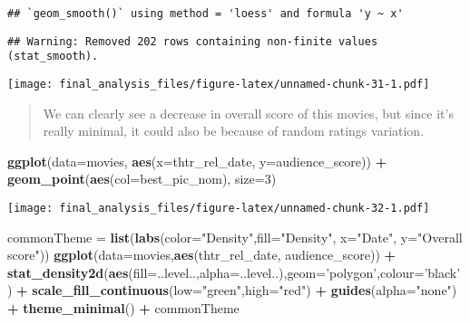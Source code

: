 \documentclass[]{article}
\newenvironment{Shaded}{\begin{snugshade}}{\end{snugshade}}
\newcommand{\KeywordTok}[1]{\textcolor[rgb]{0.13,0.29,0.53}{\textbf{#1}}}
\newcommand{\DataTypeTok}[1]{\textcolor[rgb]{0.13,0.29,0.53}{#1}}
\newcommand{\DecValTok}[1]{\textcolor[rgb]{0.00,0.00,0.81}{#1}}
\newcommand{\StringTok}[1]{\textcolor[rgb]{0.31,0.60,0.02}{#1}}
\newcommand{\OperatorTok}[1]{\textcolor[rgb]{0.81,0.36,0.00}{\textbf{#1}}}
\newcommand{\NormalTok}[1]{#1}
\begin{document}
\begin{verbatim}
## `geom_smooth()` using method = 'loess' and formula 'y ~ x'
\end{verbatim}

\begin{verbatim}
## Warning: Removed 202 rows containing non-finite values (stat_smooth).
\end{verbatim}

\texttt{[image: final\_analysis\_files/figure-latex/unnamed-chunk-31-1.pdf]}

\begin{quote}
We can clearly see a decrease in overall score of this movies, but since
it's really minimal, it could also be because of random ratings
variation.
\end{quote}

\begin{Shaded}
\begin{Highlighting}[]
\KeywordTok{ggplot}\NormalTok{(}\DataTypeTok{data=}\NormalTok{movies, }\KeywordTok{aes}\NormalTok{(}\DataTypeTok{x=}\NormalTok{thtr_rel_date, }\DataTypeTok{y=}\NormalTok{audience_score)) }\OperatorTok{+}\StringTok{ }\KeywordTok{geom_point}\NormalTok{(}\KeywordTok{aes}\NormalTok{(}\DataTypeTok{col=}\NormalTok{best_pic_nom), }\DataTypeTok{size=}\DecValTok{3}\NormalTok{)}
\end{Highlighting}
\end{Shaded}

\texttt{[image: final\_analysis\_files/figure-latex/unnamed-chunk-32-1.pdf]}

\begin{Shaded}
\begin{Highlighting}[]
\NormalTok{commonTheme =}\StringTok{ }\KeywordTok{list}\NormalTok{(}\KeywordTok{labs}\NormalTok{(}\DataTypeTok{color=}\StringTok{"Density"}\NormalTok{,}\DataTypeTok{fill=}\StringTok{"Density"}\NormalTok{, }\DataTypeTok{x=}\StringTok{"Date"}\NormalTok{, }\DataTypeTok{y=}\StringTok{"Overall score"}\NormalTok{))}
\KeywordTok{ggplot}\NormalTok{(}\DataTypeTok{data=}\NormalTok{movies,}\KeywordTok{aes}\NormalTok{(thtr_rel_date, audience_score)) }\OperatorTok{+}\StringTok{ }
\StringTok{  }\KeywordTok{stat_density2d}\NormalTok{(}\KeywordTok{aes}\NormalTok{(}\DataTypeTok{fill=}\NormalTok{..level..,}\DataTypeTok{alpha=}\NormalTok{..level..),}\DataTypeTok{geom=}\StringTok{'polygon'}\NormalTok{,}\DataTypeTok{colour=}\StringTok{'black'}\NormalTok{) }\OperatorTok{+}\StringTok{ }
\StringTok{  }\KeywordTok{scale_fill_continuous}\NormalTok{(}\DataTypeTok{low=}\StringTok{"green"}\NormalTok{,}\DataTypeTok{high=}\StringTok{"red"}\NormalTok{) }\OperatorTok{+}
\StringTok{  }\KeywordTok{guides}\NormalTok{(}\DataTypeTok{alpha=}\StringTok{"none"}\NormalTok{) }\OperatorTok{+}
\StringTok{  }\KeywordTok{theme_minimal}\NormalTok{() }\OperatorTok{+}
\StringTok{  }\NormalTok{commonTheme}
\end{Highlighting}
\end{Shaded}
\end{document}
